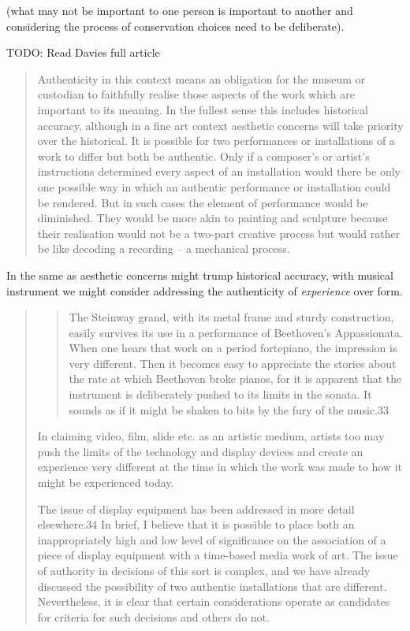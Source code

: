 (what may not be important to one person is important to another and considering
the process of conservation choices need to be deliberate).

TODO: Read Davies full article

\begin{quotation}
Authenticity in this context means an obligation for the museum or custodian to
faithfully realise those aspects of the work which are important to its meaning.
In the fullest sense this includes historical accuracy, although in a fine art
context aesthetic concerns will take priority over the historical. It is
possible for two performances or installations of a work to differ but both be
authentic. Only if a composer’s or artist’s instructions determined every aspect
of an installation would there be only one possible way in which an authentic
performance or installation could be rendered. But in such cases the element of
performance would be diminished. They would be more akin to painting and
sculpture because their realisation would not be a two-part creative process but
would rather be like decoding a recording – a mechanical process.
\end{quotation}

In the same as aesthetic concerns might trump historical accuracy, with musical
instrument we might consider addressing the authenticity of \textit{experience}
over form.


\begin{quotation}
\begin{quotation}
The Steinway grand, with its metal frame and sturdy construction, easily
survives its use in a performance of Beethoven’s Appassionata. When one hears
that work on a period fortepiano, the impression is very different. Then it
becomes easy to appreciate the stories about the rate at which Beethoven broke
pianos, for it is apparent that the instrument is deliberately pushed to its
limits in the sonata. It sounds as if it might be shaken to bits by the fury of
the music.33
\end{quotation}
In claiming video, film, slide etc. as an artistic medium, artists too may push
the limits of the technology and display devices and create an experience very
different at the time in which the work was made to how it might be experienced
today.

The issue of display equipment has been addressed in more detail elsewhere.34
In brief, I believe that it is possible to place both an inappropriately high
and low level of significance on the association of a piece of display equipment
with a time-based media work of art. The issue of authority in decisions of this
sort is complex, and we have already discussed the possibility of two authentic
installations that are different. Nevertheless, it is clear that certain
considerations operate as candidates for criteria for such decisions and others
do not.
\end{quotation}

